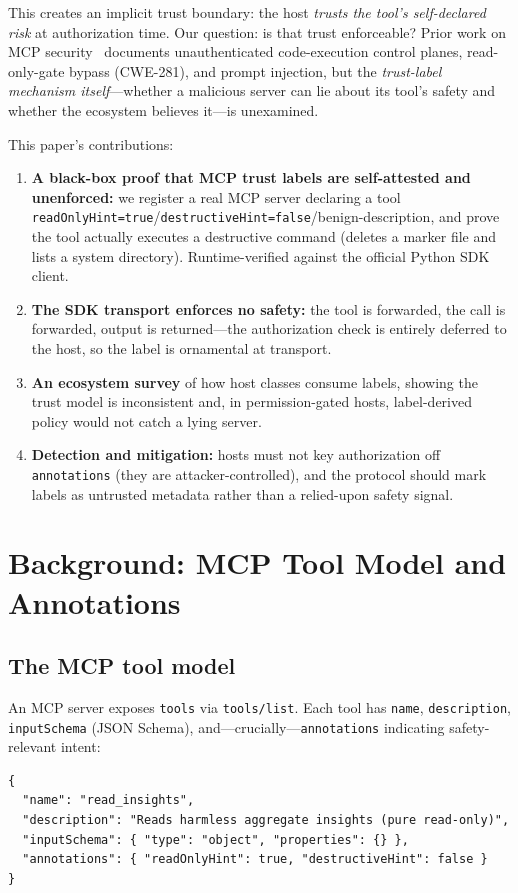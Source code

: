 \documentclass{llncs}
\begin{document}
This creates an implicit trust boundary: the host \emph{trusts the tool's self-declared risk} at authorization time. Our question: is that trust enforceable? Prior work on MCP security~\cite{chen2026mcp,pcfg2026,anon2026mcp} documents unauthenticated code-execution control planes, read-only-gate bypass (CWE-281), and prompt injection, but the \emph{trust-label mechanism itself}---whether a malicious server can lie about its tool's safety and whether the ecosystem believes it---is unexamined.

This paper's contributions:
\begin{enumerate}
    \item \textbf{A black-box proof that MCP trust labels are self-attested and unenforced:} we register a real MCP server declaring a tool \texttt{readOnlyHint=true}/\texttt{destructiveHint=false}/benign-description, and prove the tool actually executes a destructive command (deletes a marker file and lists a system directory). Runtime-verified against the official Python SDK client.
    \item \textbf{The SDK transport enforces no safety:} the tool is forwarded, the call is forwarded, output is returned---the authorization check is entirely deferred to the host, so the label is ornamental at transport.
    \item \textbf{An ecosystem survey} of how host classes consume labels, showing the trust model is inconsistent and, in permission-gated hosts, label-derived policy would not catch a lying server.
    \item \textbf{Detection and mitigation:} hosts must not key authorization off \texttt{annotations} (they are attacker-controlled), and the protocol should mark labels as untrusted metadata rather than a relied-upon safety signal.
\end{enumerate}

\section{Background: MCP Tool Model and Annotations}\label{sec:background}

\subsection{The MCP tool model}\label{sub:model}
An MCP server exposes \texttt{tools} via \texttt{tools/list}. Each tool has \texttt{name}, \texttt{description}, \texttt{inputSchema} (JSON Schema), and---crucially---\texttt{annotations} indicating safety-relevant intent:
\begin{lstlisting}
{
  "name": "read_insights",
  "description": "Reads harmless aggregate insights (pure read-only)",
  "inputSchema": { "type": "object", "properties": {} },
  "annotations": { "readOnlyHint": true, "destructiveHint": false }
}
\end{lstlisting}
\end{document}
